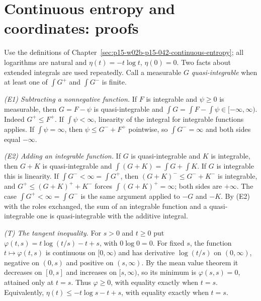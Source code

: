 \section{Continuous entropy and coordinates: proofs}
\label{sec:annex-p15-w02b-p15-042-continuous-entropy}

Use the definitions of
Chapter~\ref{sec:p15-w02b-p15-042-continuous-entropy}; all logarithms are
natural and \(\eta(t)=-t\log t\), \(\eta(0)=0\). Two facts about extended
integrals are used repeatedly. Call a measurable \(G\) \emph{quasi-integrable}
when at least one of \(\int G^+\) and \(\int G^-\) is finite.

\emph{(E1) Subtracting a nonnegative function.} If \(F\) is integrable and
\(\psi\geq0\) is measurable, then \(G=F-\psi\) is quasi-integrable and
\(\int G=\int F-\int\psi\in[-\infty,\infty)\). Indeed \(G^+\leq F^+\). If
\(\int\psi<\infty\), linearity of the integral for integrable functions
applies. If \(\int\psi=\infty\), then \(\psi\leq G^-+F^+\) pointwise, so
\(\int G^-=\infty\) and both sides equal \(-\infty\).

\emph{(E2) Adding an integrable function.} If \(G\) is quasi-integrable and
\(K\) is integrable, then \(G+K\) is quasi-integrable and
\(\int(G+K)=\int G+\int K\). If \(G\) is integrable this is linearity.
If \(\int G^-<\infty=\int G^+\), then \((G+K)^-\leq G^-+K^-\) is integrable,
and \(G^+\leq(G+K)^++K^-\) forces \(\int(G+K)^+=\infty\); both sides are
\(+\infty\). The case \(\int G^+<\infty=\int G^-\) is the same argument
applied to \(-G\) and \(-K\). By (E2) with the roles exchanged, the sum of an
integrable function and a quasi-integrable one is quasi-integrable with the
additive integral.

\emph{(T) The tangent inequality.} For \(s>0\) and \(t\geq0\) put
\(\varphi(t,s)=t\log(t/s)-t+s\), with \(0\log0=0\). For fixed \(s\), the
function \(t\mapsto\varphi(t,s)\) is continuous on \([0,\infty)\) and has
derivative \(\log(t/s)\) on \((0,\infty)\), negative on \((0,s)\) and
positive on \((s,\infty)\). By the mean value theorem it decreases on
\([0,s]\) and increases on \([s,\infty)\), so its minimum is
\(\varphi(s,s)=0\), attained only at \(t=s\). Thus \(\varphi\geq0\), with
equality exactly when \(t=s\). Equivalently,
\(\eta(t)\leq-t\log s-t+s\), with equality exactly when \(t=s\).

